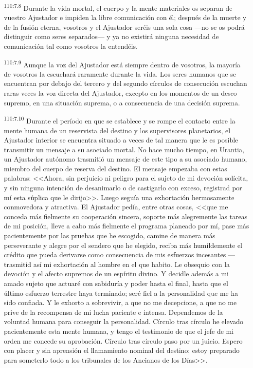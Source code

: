 \documentclass[twoside, 11pt]{book}
\begin{document}
\par
\textsuperscript{110:7.8} Durante la vida mortal, el cuerpo y la mente materiales os separan de vuestro Ajustador e impiden la libre comunicación con él; después de la muerte y de la fusión eterna, vosotros y el Ajustador seréis una sola cosa ---no se os podrá distinguir como seres separados--- y ya no existirá ninguna necesidad de comunicación tal como vosotros la entendéis.

\par
\textsuperscript{110:7.9} Aunque la voz del Ajustador está siempre dentro de vosotros, la mayoría de vosotros la escuchará raramente durante la vida. Los seres humanos que se encuentran por debajo del tercero y del segundo círculos de consecución escuchan raras veces la voz directa del Ajustador, excepto en los momentos de un deseo supremo, en una situación suprema, o a consecuencia de una decisión suprema.

\par
\textsuperscript{110:7.10} Durante el período en que se establece y se rompe el contacto entre la mente humana de un reservista del destino y los supervisores planetarios, el Ajustador interior se encuentra situado a veces de tal manera que le es posible transmitir un mensaje a su asociado mortal. No hace mucho tiempo, en Urantia, un Ajustador autónomo trasmitió un mensaje de este tipo a su asociado humano, miembro del cuerpo de reserva del destino. El mensaje empezaba con estas palabras: <<Ahora, sin perjuicio ni peligro para el sujeto de mi devoción solícita, y sin ninguna intención de desanimarlo o de castigarlo con exceso, registrad por mí esta súplica que le dirijo>>. Luego seguía una exhortación hermosamente conmovedora y atractiva. El Ajustador pedía, entre otras cosas, <<que me conceda más fielmente su cooperación sincera, soporte más alegremente las tareas de mi posición, lleve a cabo más fielmente el programa planeado por mí, pase más pacientemente por las pruebas que he escogido, camine de manera más perseverante y alegre por el sendero que he elegido, reciba más humildemente el crédito que pueda derivarse como consecuencia de mis esfuerzos incesantes ---trasmitid así mi exhortación al hombre en el que habito. Le obsequio con la devoción y el afecto supremos de un espíritu divino. Y decidle además a mi amado sujeto que actuaré con sabiduría y poder hasta el final, hasta que el último esfuerzo terrestre haya terminado; seré fiel a la personalidad que me ha sido confiada. Y le exhorto a sobrevivir, a que no me decepcione, a que no me prive de la recompensa de mi lucha paciente e intensa. Dependemos de la voluntad humana para conseguir la personalidad. Círculo tras círculo he elevado pacientemente esta mente humana, y tengo el testimonio de que el jefe de mi orden me concede su aprobación. Círculo tras círculo paso por un juicio. Espero con placer y sin aprensión el llamamiento nominal del destino; estoy preparado para someterlo todo a los tribunales de los Ancianos de los Días>>.
\end{document}
